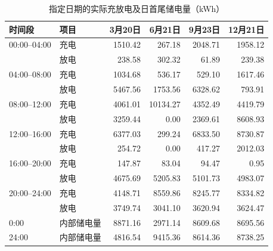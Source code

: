 \begin{table}[!htbp]
\centering
\caption{指定日期的实际充放电及日首尾储电量（kWh）}
\label{tab:q3_storage}
\small
\setlength{\tabcolsep}{5pt}
\begin{tabular}{llrrrr}
\toprule
时间段 & 项目 & 3月20日 & 6月21日 & 9月23日 & 12月21日 \\
\midrule
00:00--04:00 & 充电 & 1510.42 & 267.18 & 2048.71 & 1958.12 \\
 & 放电 & 238.58 & 302.32 & 61.89 & 239.38 \\
04:00--08:00 & 充电 & 1034.68 & 536.17 & 529.10 & 1617.46 \\
 & 放电 & 5467.56 & 1753.56 & 6328.62 & 793.91 \\
08:00--12:00 & 充电 & 4061.01 & 10134.27 & 4352.49 & 4419.79 \\
 & 放电 & 3259.44 & 0.00 & 2369.61 & 8608.93 \\
12:00--16:00 & 充电 & 6377.03 & 299.24 & 6833.50 & 8730.87 \\
 & 放电 & 254.72 & 0.00 & 417.27 & 2012.03 \\
16:00--20:00 & 充电 & 147.87 & 83.04 & 94.47 & 0.95 \\
 & 放电 & 4675.69 & 5205.83 & 5101.73 & 4983.07 \\
20:00--24:00 & 充电 & 4148.71 & 8559.86 & 8245.77 & 8334.82 \\
 & 放电 & 3749.74 & 3041.10 & 3620.94 & 3624.47 \\
\midrule
0:00 & 内部储电量 & 8871.16 & 2971.14 & 8609.68 & 8695.56 \\
24:00 & 内部储电量 & 4816.54 & 9415.36 & 8614.36 & 8738.25 \\
\bottomrule
\end{tabular}
\end{table}
